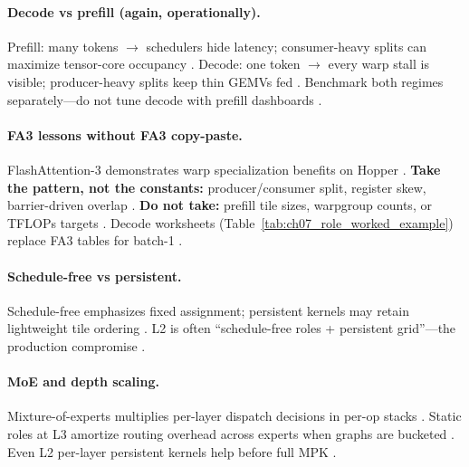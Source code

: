 \paragraph{Decode vs prefill (again, operationally).}
Prefill: many tokens $\rightarrow$ schedulers hide latency; consumer-heavy splits can maximize tensor-core occupancy \citep{kwon2023vllm,shah2024flashattention3}.
Decode: one token $\rightarrow$ every warp stall is visible; producer-heavy splits keep thin GEMVs fed \citep{patel2025llminference,memoryfloor2026,taxbreak2026}.
Benchmark both regimes separately---do not tune decode with prefill dashboards \citep{yirage2026,taxbreak2026}.

\paragraph{FA3 lessons without FA3 copy-paste.}
FlashAttention-3 demonstrates warp specialization benefits on Hopper \citep{shah2024flashattention3}.
\textbf{Take the pattern, not the constants:} producer/consumer split, register skew, barrier-driven overlap \citep{semianalysis2024tma,nvidia2022hopper}.
\textbf{Do not take:} prefill tile sizes, warpgroup counts, or TFLOPs targets \citep{patel2025llminference,memoryfloor2026,kwon2023vllm}.
Decode worksheets (Table~\ref{tab:ch07_role_worked_example}) replace FA3 tables for batch-1 \citep{yirage2026,taxbreak2026}.

\paragraph{Schedule-free vs persistent.}
Schedule-free emphasizes fixed assignment; persistent kernels may retain lightweight tile ordering \citep{shah2024flashattention3,mpk2025,nvidia2024cudagraphs}.
L2 is often ``schedule-free roles + persistent grid''---the production compromise \citep{patel2025llminference,yirage2026,taxbreak2026}.

\paragraph{MoE and depth scaling.}
Mixture-of-experts multiplies per-layer dispatch decisions in per-op stacks \citep{taxbreak2026,liu2024deepseekv3}.
Static roles at L3 amortize routing overhead across experts when graphs are bucketed \citep{mpk2025,wu2024mirage,patel2025llminference}.
Even L2 per-layer persistent kernels help before full MPK \citep{shah2024flashattention3,nvidia2024cudagraphs,yirage2026}.

